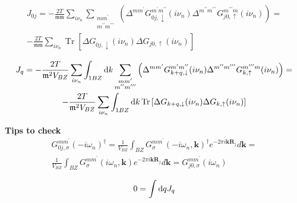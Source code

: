 \documentclass[12pt,a4paper]{article}
\begin{document}
\begin{multline*}
    J_{0 j}= -\frac{2T}{{\mathfrak m} {\mathfrak m}}  \sum_{i \nu_n} \sum_{\substack{m m^{\prime} \\ m^{\prime \prime} m^{\prime \prime \prime}}} 
    \left(\Delta^{m m^{\prime}}  G_{0 j, \downarrow}^{m^{\prime} m^{\prime \prime}} (i \nu_n)  \Delta^{m^{\prime \prime} m^{\prime \prime \prime}}   G_{j 0, \uparrow}^{m^{\prime \prime \prime} m} (i \nu_n) \right) =\\
    -\frac{2T}{{\mathfrak m} {\mathfrak m}}   \sum_{i \nu_n} \operatorname{Tr}
    \left[\Delta G_{0 j, \downarrow}(i \nu_n) \Delta G_{j 0, \uparrow}(i \nu_n) \right]
\end{multline*}

\begin{multline*}
    J_{q}=-\frac{2T}{{\mathfrak m}^2  V_{BZ}}  \sum_{i \nu_n} \int_{1 BZ} \mathop{}\!\mathrm{d} k \sum_{\substack{m m^{\prime} \\ m^{\prime \prime} m^{\prime \prime \prime}}}  
    \left(\Delta^{m m^{\prime}}  G_{k + q, \downarrow}^{m^{\prime} m^{\prime \prime}} (i \nu_n)  \Delta^{m^{\prime \prime} m^{\prime \prime \prime}}   G_{k, \uparrow}^{m^{\prime \prime \prime} m} (i \nu_n) \right) = \\
    -\frac{2T}{{\mathfrak m}^2  V_{BZ}}  \sum_{i \nu_n}  \int_{1 BZ} \mathop{}\!\mathrm{d} k \operatorname{Tr}
    \left[\Delta G_{k+ q, \downarrow}(i \nu_n) \Delta G_{k, \uparrow}(i \nu_n) \right]
\end{multline*}


\begin{tcolorbox}
\textbf{Tips to check}
    \begin{multline*}
        G_{0 j, \sigma}^{m m^{\prime}}( - i \omega_n)^{\dagger} = \frac{1}{V_{BZ}} \int_{B Z} G_{\sigma}^{m m^{\prime}}(- i \omega_n, \mathbf{k})^{\dagger} e^{- 2 \pi i \mathbf{k} \mathbf{R}_{j}} d \mathbf{k} = \\
        \frac{1}{V_{BZ}} \int_{B Z} G_{\sigma}^{m m^{\prime}}( i \omega_n, \mathbf{k}) e^{- 2 \pi i \mathbf{k} \mathbf{R}_{j}} d \mathbf{k} = G_{j 0, \sigma}^{m m^{\prime}}(  i \omega_n)
    \end{multline*}

    \[
    0 = \int \mathop{}\!\mathrm{d} q J_{q}
    \]

\end{tcolorbox}
\end{document}
